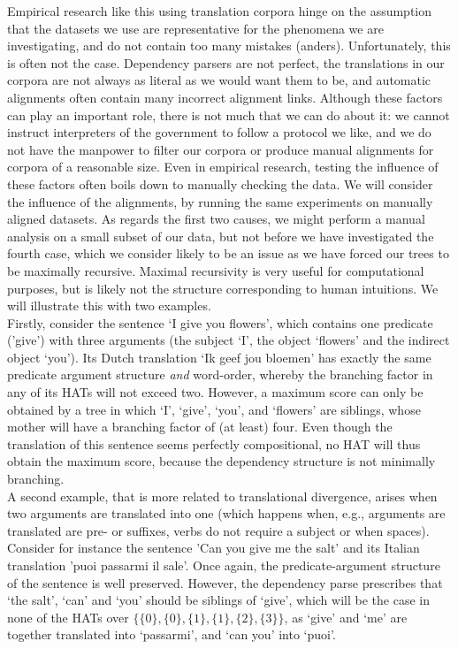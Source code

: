 \documentclass{report}
\theoremstyle{definition}
\theoremstyle{plain}
\begin{document}
Empirical research like this using translation corpora hinge on the assumption that the datasets we use are representative for the phenomena we are investigating, and do not contain too many mistakes (anders). Unfortunately, this is often not the case. Dependency parsers are not perfect, the translations in our corpora are not always as literal as we would want them to be, and automatic alignments often contain many incorrect alignment links. Although these factors can play an important role, there is not much that we can do about it: we cannot instruct interpreters of the government to follow a protocol we like, and we do not have the manpower to filter our corpora or produce manual alignments for corpora of a reasonable size. Even in empirical research, testing the influence of these factors often boils down to manually checking the data. We will consider the influence of the alignments, by running the same experiments on manually aligned datasets. As regards the first two causes, we might perform a manual analysis on a small subset of our data, but not before we have investigated the fourth case, which we consider likely to be an issue as we have forced our trees to be maximally recursive. Maximal recursivity is very useful for computational purposes, but is likely not the structure corresponding to human intuitions. We will illustrate this with two examples.\\
Firstly, consider the sentence `I give you flowers', which contains one predicate ('give') with three arguments (the subject `I', the object `flowers' and the indirect object `you'). Its Dutch translation `Ik geef jou bloemen' has exactly the same predicate argument structure \textit{and} word-order, whereby the branching factor in any of its HATs will not exceed two. However, a maximum score can only be obtained by a tree in which `I', `give', `you', and `flowers' are siblings, whose mother will have a branching factor of (at least) four. Even though the translation of this sentence seems perfectly compositional, no HAT will thus obtain the maximum score, because the dependency structure is not minimally branching.\\
A second example, that is more related to translational divergence, arises when two arguments are translated into one (which happens when, e.g., arguments are translated are pre- or suffixes, verbs do not require a subject or when spaces). Consider for instance the sentence 'Can you give me the salt' and its Italian translation 'puoi passarmi il sale'. Once again, the predicate-argument structure of the sentence is well preserved. However, the dependency parse prescribes that `the salt', `can' and `you' should be siblings of `give', which will be the case in none of the HATs over $\{\{0\},\{0\},\{1\},\{1\},\{2\},\{3\}\}$, as `give' and `me' are together translated into `passarmi', and `can you' into `puoi'.\\
\end{document}
